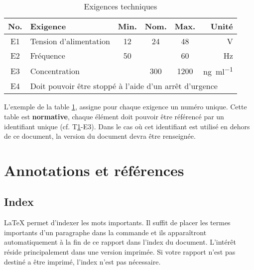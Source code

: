 \begin{table}[h]
    \begin{center}
        \caption{Exigences techniques \label{specification}}
        \begin{tabularx}{\textwidth}{cXcccr}
            \toprule
            No. & Exigence                                                                   & Min. & Nom. & Max. & Unité                           \\
            \midrule
            E1  & Tension d'alimentation                                                     & 12   & 24   & 48   & \si{\volt}                      \\
            E2  & Fréquence                                                                  & 50   &      & 60   & \si{\hertz}                     \\
            E3  & Concentration                                                              &      & 300  & 1200 & \si{\nano\gram\per\milli\litre} \\
            E4  & \multicolumn{5}{l}{Doit pouvoir être stoppé à l'aide d'un arrêt d'urgence}                                                        \\
            \bottomrule
        \end{tabularx}
    \end{center}
\end{table}

L'exemple de la table \ref{specification}, assigne pour chaque exigence un numéro unique. Cette table est \textbf{normative}, chaque élément doit pouvoir être référencé par un identifiant unique (cf. T\ref{specification}-E3). Dans le cas où cet identifiant est utilisé en dehors de ce document, la version du document devra être renseignée.

\section{Annotations et références}

\subsection{Index}
\LaTeX{} permet d'indexer les mots  importants. Il suffit de placer les termes importants d'un paragraphe dans la commande \texttt{} et ils apparaîtront automatiquement à la fin de ce rapport dans l'index du document. L'intérêt réside principalement dans une version imprimée. Si votre rapport n'est pas destiné a être imprimé, l'index n'est pas nécessaire.

